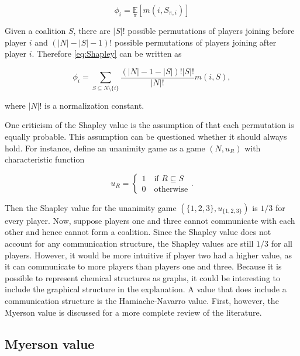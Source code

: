 \begin{equation}
    \label{eq:Shapley}
    \phi_i = \underset{\pi}{\mathbb{E}} \left[ m\left(i, S_{\pi, i} \right) \right]
\end{equation}


Given a coalition $S$, there are $|S|!$ possible permutations of players joining 
before player $i$ and $(|N| - |S| - 1)!$ possible permutations of players joining after 
player $i$. Therefore \cref{eq:Shapley} can be written as 


\begin{equation}
    \label{eq:Shapley_2}
    \phi_i = \sum_{S \subseteq N \setminus \{i\}} \frac{\left(|N| - 1 - |S|\right)!|S|!}{|N|!} m(i, S),
\end{equation}


where $|N|!$ is a normalization constant.

One criticism of the Shapley value is the assumption of that each permutation 
is equally probable. This assumption can be questioned whether it should always hold. For instance, 
define an unanimity game as a game $(N, u_R)$ with characteristic function


\begin{equation}
	u_R = \begin{cases}
		1 \quad \text{if } R \subseteq S \\
		0 \quad \text{otherwise}
	\end{cases}.
\end{equation}


Then the Shapley value for the unanimity game $(\{1, 2, 3\}, u_{\{1,2,3\}})$ is $1/3$ for every player.\cite{hamiache_value_1999}
Now, suppose players one and three cannot communicate with each other and hence cannot form a coalition.
Since the Shapley value does not account for any communication structure, the Shapley values are still
$1/3$ for all players. However, it would be more intuitive if player two had a higher value, as it can
communicate to more players than players one and three. Because it is possible to represent chemical
structures as graphs, it could be interesting to include the graphical structure in the explanation. A
value that does include a communication structure is the Hamiache-Navarro value.
First, however, the Myerson value is discussed for a more complete review of the literature.
\cite{hamiache_value_1999, hamiache_associated_2020}


\subsection{Myerson value}


